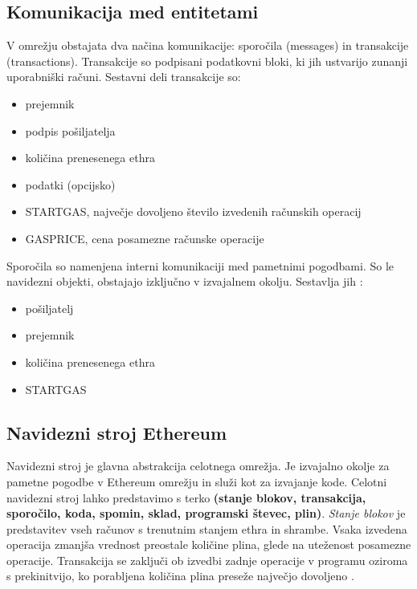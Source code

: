 \documentclass[a4paper, 12pt]{book}
\begin{document}
\subsection{Komunikacija med entitetami}
V omrežju obstajata dva načina komunikacije: sporočila (messages) in transakcije (transactions).
Transakcije so podpisani podatkovni bloki, ki jih ustvarijo zunanji uporabniški računi.
Sestavni deli transakcije so:
\begin{itemize}
	\item prejemnik
	\item podpis pošiljatelja
	\item količina prenesenega ethra
	\item podatki (opcijsko)
	\item STARTGAS, največje dovoljeno število izvedenih računskih operacij
	\item GASPRICE, cena posamezne računske operacije
\end{itemize}

Sporočila so namenjena interni komunikaciji med pametnimi pogodbami.
So le navidezni objekti, obstajajo izključno v izvajalnem okolju.
Sestavlja jih \cite{ethereumWhitepaper}:
\begin{itemize}
	\item pošiljatelj
	\item prejemnik
	\item količina prenesenega ethra
	\item STARTGAS
\end{itemize}


\subsection{Navidezni stroj Ethereum}

Navidezni stroj je glavna abstrakcija celotnega omrežja.
Je izvajalno okolje za pametne pogodbe v Ethereum omrežju in služi kot  za izvajanje kode.
Celotni navidezni stroj lahko predstavimo s terko \textbf{(stanje blokov, transakcija, sporočilo, koda, spomin, sklad, programski števec, plin)}.
\textit{Stanje blokov} je predstavitev vseh računov s trenutnim stanjem ethra in shrambe.
Vsaka izvedena operacija zmanjša vrednost preostale količine plina, glede na uteženost posamezne operacije.
Transakcija se zaključi ob izvedbi zadnje operacije v programu oziroma s prekinitvijo, ko porabljena količina plina preseže največjo dovoljeno \cite{ethereumWhitepaper}.
\end{document}
